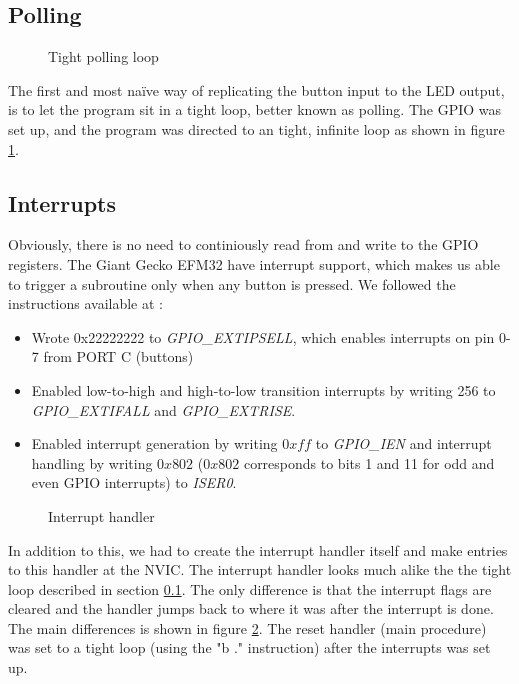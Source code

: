 	\subsection{Polling}
	\label{subsection:polling}
	\begin{figure}[h]
		
		\caption{Tight polling loop}
		\label{code:polling_loop}
	\end{figure}
	The first and most naïve way of replicating the button input to the LED output, is to let the program sit in a tight loop, better known as polling. The GPIO was set up, and the program was directed to an tight, infinite loop as shown in figure \ref{code:polling_loop}.

	\subsection{Interrupts}
	\label{subsection:interrupts}
	Obviously, there is no need to continiously read from and write to the GPIO registers. The Giant Gecko EFM32 have interrupt support, which makes us able to trigger a subroutine only when any button is pressed. We followed the instructions available at \cite[p. 24]{compendium}:
	\begin{itemize}
		\item Wrote 0x22222222 to \emph{GPIO\_EXTIPSELL}, which enables interrupts on pin 0-7 from PORT C (buttons) \cite[p. 770]{reference_manual}
		\item Enabled low-to-high and high-to-low transition interrupts by writing 256 to \emph{GPIO\_EXTIFALL} and \emph{GPIO\_EXTRISE}.
		\item Enabled interrupt generation by writing $0xff$ to \emph{GPIO\_IEN} and interrupt handling by writing $0x802$ ($0x802$ corresponds to bits 1 and 11 for odd and even GPIO interrupts) to \emph{ISER0}.
	\end{itemize}
	
	\begin{figure}[h]
		
		\caption{Interrupt handler}
		\label{code:interrupt_handler}
	\end{figure}


In addition to this, we had to create the interrupt handler itself and make entries to this handler at the NVIC. The interrupt handler looks much alike the the tight loop described in section \ref{subsection:polling}. The only difference is that the interrupt flags are cleared and the handler jumps back to where it was after the interrupt is done. The main differences is shown in figure \ref{code:interrupt_handler}. The reset handler (main procedure) was set to a tight loop (using the "b ." instruction) after the interrupts was set up.

